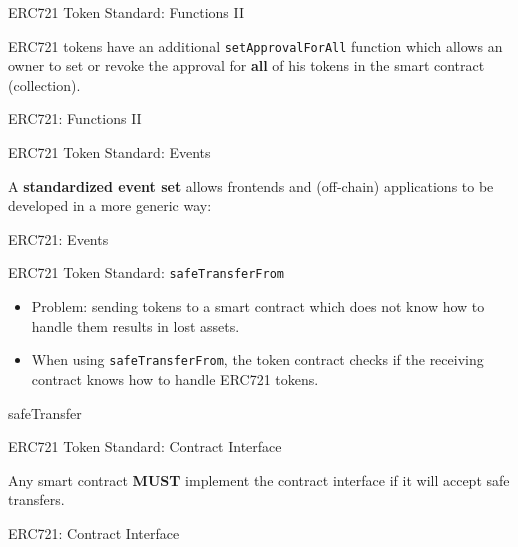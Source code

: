 \documentclass[handout]{beamer}
\begin{document}
\begin{frame}{ERC721 Token Standard: Functions II}

ERC721 tokens have an additional \texttt{setApprovalForAll} function which allows an owner to set or revoke the approval for \textbf{all} of his tokens in the smart contract (collection). 
\vspace{1em}
	\begin{samplecode}{ERC721: Functions II}
		
	\end{samplecode}
\end{frame}

\begin{frame}{ERC721 Token Standard: Events}

\vspace{0.5em}
	A \textbf{standardized event set} allows frontends and (off-chain) applications to be developed in a more generic way:
\vspace{1em}
	\begin{samplecode}{ERC721: Events}
		
	\end{samplecode}
\end{frame}

\begin{frame}{ERC721 Token Standard: \texttt{safeTransferFrom}}

\begin{itemize}
	\item Problem: sending tokens to a smart contract which does not know how to handle them results in lost assets.
	\item When using \texttt{safeTransferFrom}, the token contract checks if the receiving contract knows how to handle ERC721 tokens. 
\end{itemize}
\vspace{1em}
	\begin{samplecode}{safeTransfer}
		
	\end{samplecode}
\end{frame}


\begin{frame}{ERC721 Token Standard: Contract Interface}

\vspace{0.5em}
	Any smart contract \textbf{MUST} implement the contract interface if it will accept safe transfers.
\vspace{1em}
	\begin{samplecode}{ERC721: Contract Interface}
		
	\end{samplecode}
\end{frame}
\end{document}
